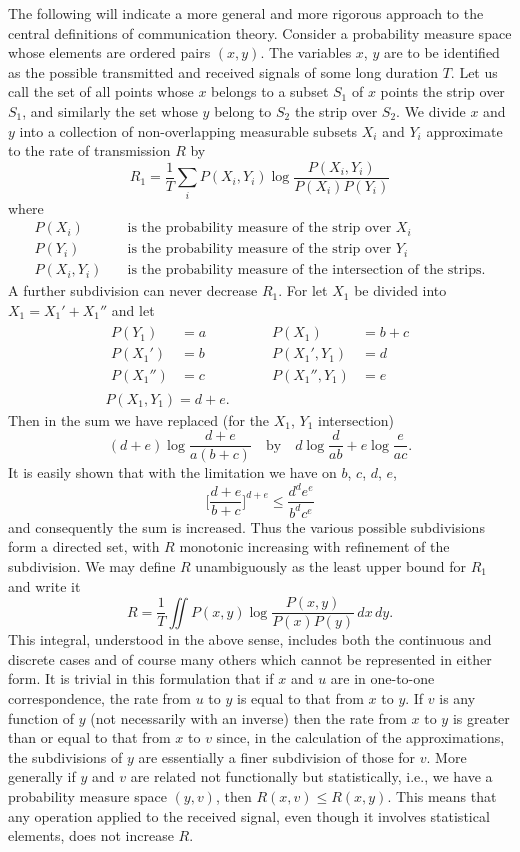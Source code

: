 The following will indicate a more general and more rigorous approach to
the central definitions of communication theory.  Consider a probability
measure space whose elements are ordered pairs $(x,y)$.  The variables
$x$, $y$ are to be identified as the possible transmitted and received
signals of some long duration $T$.  Let us call the set of all points whose
$x$ belongs to a subset $S_1$ of $x$ points the strip over $S_1$, and
similarly the set whose $y$ belong to $S_2$ the strip over $S_2$.  We
divide $x$ and $y$ into a collection of non-overlapping measurable subsets
$X_i$ and $Y_i$ approximate to the rate of transmission $R$ by
$$
R_1=\frac1T\sum_i P(X_i,Y_i)\log\frac{P(X_i,Y_i)}{P(X_i)P(Y_i)}
$$
where
\begin{align*}
P(X_i)\quad&\mbox{is the probability measure of the strip over $X_i$}\\
P(Y_i)\quad&\mbox{is the probability measure of the strip over $Y_i$}\\
P(X_i,Y_i)\quad&\mbox{is the probability measure of the
	intersection of the strips}.
\end{align*}
A further subdivision can never decrease $R_1$.  For let $X_1$ be divided
into $X_1=X_1'+X_1''$ and let
\begin{gather*}
\begin{aligned}
P(Y_1)&=a  & P(X_1)&=b+c\\
P(X_1')&=b & P(X_1',Y_1)&=d\\
P(X_1'')&=c \qquad\qquad & P(X_1'',Y_1)&=e
\end{aligned}\\
P(X_1,Y_1)=d+e.
\end{gather*}
Then in the sum we have replaced (for the $X_1$, $Y_1$ intersection)
$$
(d+e)\log\frac{d+e}{a(b+c)}
\quad\text{by}\quad
d\log\frac{d}{ab}+e\log\frac{e}{ac}.
$$
It is easily shown that with the limitation we have on $b$, $c$, $d$, $e$,
$$
\biggl[\frac{d+e}{b+c}\biggr]^{d+e}\leq\frac{d^d e^e}{b^d c^e}
$$
and consequently the sum is increased.  Thus the various possible
subdivisions form a directed set, with $R$ monotonic increasing with
refinement of the subdivision.  We may define $R$ unambiguously as the
least upper bound for $R_1$ and write it
$$
R=\frac1T\iint P(x,y)\log\frac{P(x,y)}{P(x)P(y)}\,dx\,dy.
$$
This integral, understood in the above sense, includes both the continuous
and discrete cases and of course many others which cannot be
represented in either form.  It is trivial in this formulation that if $x$
and $u$ are in one-to-one correspondence, the rate from $u$ to $y$ is equal
to that from $x$ to $y$.  If $v$ is any function of $y$ (not necessarily
with an inverse) then the rate from $x$ to $y$ is greater than or equal to
that from $x$ to $v$ since, in the calculation of the approximations, the
subdivisions of $y$ are essentially a finer subdivision of those for $v$.
More generally if $y$ and $v$ are related not functionally but
statistically, i.e., we have a probability measure space $(y,v)$, then
$R(x,v)\leq R(x,y)$.  This means that any operation applied to the received
signal, even though it involves statistical elements, does not increase
$R$.

